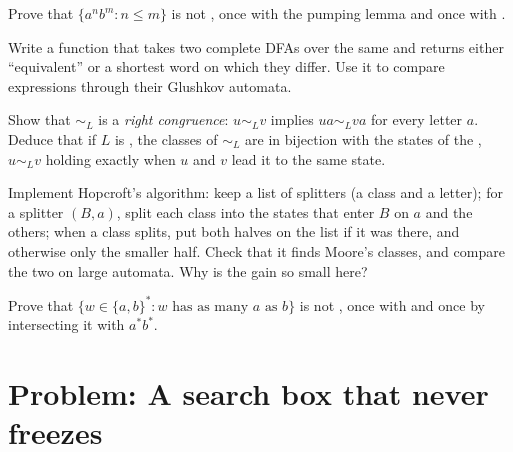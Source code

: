 \begin{exercise}[$\star\star$]\label{exo:b2:regular-languages:8}
Prove that $\{a^n b^m : n \le m\}$ is not , once with the pumping lemma and once with .
\end{exercise}

\begin{exercise}[$\star\star$]\label{exo:b2:regular-languages:9}
Write a function that takes two complete DFAs over the same  and returns either ``equivalent'' or a shortest
word on which they differ. Use it to compare expressions through their Glushkov automata.
\end{exercise}

\begin{exercise}[$\star\star\star$]\label{exo:b2:regular-languages:10}
Show that $\sim_L$ is a \emph{right congruence}: $u \sim_L v$ implies $ua \sim_L va$ for every letter $a$. Deduce that
if $L$ is , the classes of $\sim_L$ are in bijection with the states of the , $u \sim_L v$
holding exactly when $u$ and $v$ lead it to the same state.
\end{exercise}

\begin{exercise}[$\star\star\star$]\label{exo:b2:regular-languages:11}
Implement Hopcroft's algorithm: keep a list of splitters (a class and a letter); for a splitter $(B, a)$, split each
class into the states that enter $B$ on $a$ and the others; when a class splits, put both halves on the list if it
was there, and otherwise only the smaller half. Check that it finds Moore's classes, and compare the two on large
automata. Why is the gain so small here?
\end{exercise}

\begin{exercise}[$\star\star\star$]\label{exo:b2:regular-languages:12}
Prove that $\{w \in \{a, b\}^* : w \text{ has as many } a \text{ as } b\}$ is not , once with  and
once by intersecting it with $a^*b^*$.
\end{exercise}

\section{Problem: A search box that never freezes}\label{sec:b2:regular-languages:problem}

